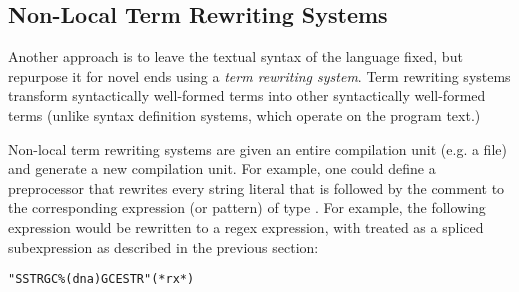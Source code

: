 {%


\subsection{Non-Local Term Rewriting Systems}\label{sec:non-local-term-rewriting}
Another approach is to leave the textual syntax of the language fixed, but repurpose it for novel ends using a \emph{term rewriting system}. Term rewriting systems transform syntactically well-formed terms into other syntactically well-formed terms (unlike syntax definition systems, which operate on the program text.) 

Non-local term rewriting systems are given an entire compilation unit (e.g. a file) and generate a new compilation unit. For example, one could define a preprocessor that rewrites every string literal that is followed by the comment  to the corresponding expression (or pattern) of type . For example, the following expression would be rewritten to a regex expression, with  treated as a spliced subexpression as described in the previous section:
\begin{lstlisting}[numbers=none]
"SSTRGC%(dna)GCESTR"(*rx*)
\end{lstlisting}

}

